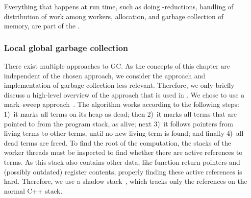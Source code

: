 Everything that happens at run time, such as doing \fxbeta-reductions, handling of distribution of work among workers, allocation, and garbage collection of memory, are part of the .

\subsubsection{Local \texorpdfstring{\protect\vs}{vs.} global garbage collection}


There exist multiple approaches to \ac{GC}.
As the concepts of this chapter are independent of the chosen approach, we consider the approach and implementation of garbage collection less relevant.
Therefore, we only briefly discuss a high-level overview of the approach that is used in \ourfp.
We chose to use a mark--sweep approach~\cite{jones:gc_handbook}.
The algorithm works according to the following steps:
1)~it marks all terms on its heap as dead; then
2)~it marks all terms that are pointed to from the program stack, as alive; next
3)~it follows pointers from living terms to other terms, until no new living term is found; and finally
4)~all dead terms are freed.
To find the root of the computation, the stacks of the worker threads must be inspected to find whether there are active references to terms.
As this stack also contains other data, like function return pointers and (possibly outdated) register contents, properly finding these active references is hard.
Therefore, we use a shadow stack~\cite{henderson:gc_in_uncoop_env}, which tracks only the \lterm references on the normal C++ stack.


